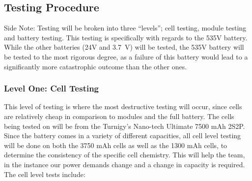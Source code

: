 \documentclass[main.tex]{subfiles}
\begin{document}
    \subsection{Testing Procedure}
    \label{subsec:testing-proc}
    Side Note: Testing will be broken into three “levels”; cell testing, module testing and battery testing. This testing is specifically with regards to the 535V battery. While the other batteries (24V and \SI{3.7}{V}) will be tested, the 535V battery will be tested to the most rigorous degree, as a failure of this battery would lead to a significantly more catastrophic outcome than the other ones.

    \subsubsection{Level One: Cell Testing}
    This level of testing is where the most destructive testing will occur, since cells are relatively cheap in comparison to modules and the full battery. The cells being tested on will be from the Turnigy’s Nano-tech Ultimate  7500 mAh 2S2P. Since the battery comes in a variety of different capacities, all cell level testing will be done on both the 3750 mAh cells as well as the 1300 mAh cells, to determine the consistency of the specific cell chemistry. This will help the team, in the instance our power demands change and a change in capacity is required. The cell level tests include:
\end{document}
